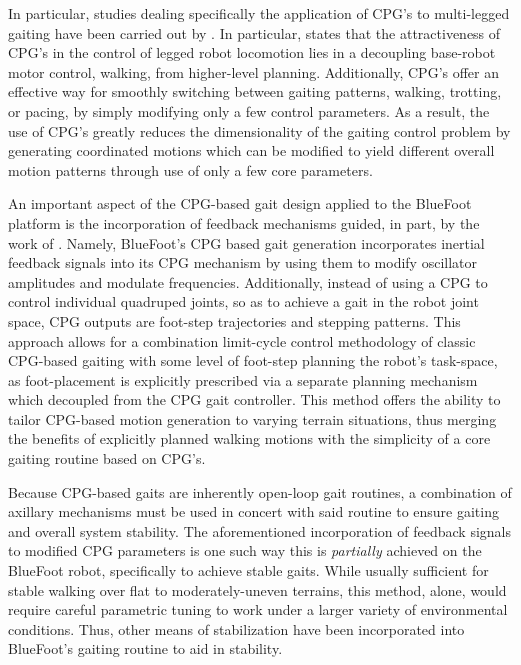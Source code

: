 		In particular, studies dealing specifically the application of CPG's to multi-legged gaiting have been carried out by \cite{Arena2001,Klaasan2002,Arena2004,Inagaki2003,Inagaki2006,Billard2000,Brambilla2006,Buchli2006,Tsujita2001,Tsujita2004}.  In particular, \cite{Ijspeert2008} states that the attractiveness of CPG's in the control of legged robot locomotion lies in a decoupling base-robot motor control, \IE walking, from higher-level planning. Additionally, CPG's offer an effective way for smoothly switching between gaiting patterns, \EG walking, trotting, or pacing, by simply modifying only a few control parameters. As a result, the use of CPG's greatly reduces the dimensionality of the gaiting control problem by generating coordinated motions which can be modified to yield different overall motion patterns through use of only a few core parameters.

		An important aspect of the CPG-based gait design applied to the BlueFoot platform is the incorporation of feedback mechanisms guided, in part, by the work of \cite{Fukuoka2003,Endo2004}. Namely, BlueFoot's CPG based gait generation incorporates inertial feedback signals into its CPG mechanism by using them to modify oscillator amplitudes and modulate frequencies. Additionally, instead of using a CPG to control individual quadruped joints, so as to achieve a gait in the robot joint space, CPG outputs are foot-step trajectories and stepping patterns. This approach allows for a combination limit-cycle control methodology of classic CPG-based gaiting with some level of foot-step planning the robot's task-space, as foot-placement is explicitly prescribed via a separate planning mechanism which decoupled from the CPG gait controller. This method offers the ability to tailor CPG-based motion generation to varying terrain situations, thus merging the benefits of explicitly planned walking motions with the simplicity of a core gaiting routine based on CPG's.

		Because CPG-based gaits are inherently open-loop gait routines, a combination of axillary mechanisms must be used in concert with said routine to ensure gaiting and overall system stability. The aforementioned incorporation of feedback signals to modified CPG parameters is one such way this is \emph{partially} achieved on the BlueFoot robot, specifically to achieve stable gaits. While usually sufficient for stable walking over flat to moderately-uneven terrains, this method, alone, would require careful parametric tuning to work under a larger variety of environmental conditions. Thus, other means of stabilization have been incorporated into BlueFoot's gaiting routine to aid in stability.

